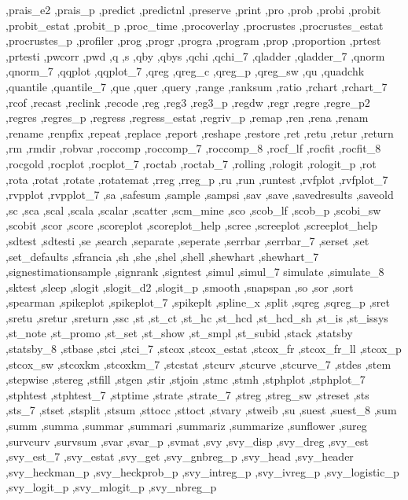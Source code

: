 {{    ,prais_e2 ,prais_p ,predict ,predictnl ,preserve ,print ,pro ,prob
    ,probi ,probit ,probit_estat ,probit_p ,proc_time ,procoverlay
    ,procrustes ,procrustes_estat ,procrustes_p ,profiler ,prog ,progr
    ,progra ,program ,prop ,proportion ,prtest ,prtesti ,pwcorr ,pwd
    ,q ,s ,qby ,qbys ,qchi ,qchi_7 ,qladder ,qladder_7 ,qnorm ,qnorm_7
    ,qqplot ,qqplot_7 ,qreg ,qreg_c ,qreg_p ,qreg_sw ,qu ,quadchk
    ,quantile ,quantile_7 ,que ,quer ,query ,range ,ranksum ,ratio
    ,rchart ,rchart_7 ,rcof ,recast ,reclink ,recode ,reg ,reg3
    ,reg3_p ,regdw ,regr ,regre ,regre_p2 ,regres ,regres_p ,regress
    ,regress_estat ,regriv_p ,remap ,ren ,rena ,renam ,rename ,renpfix
    ,repeat ,replace ,report ,reshape ,restore ,ret ,retu ,retur ,return
    ,rm ,rmdir ,robvar ,roccomp ,roccomp_7 ,roccomp_8 ,rocf_lf ,rocfit
    ,rocfit_8 ,rocgold ,rocplot ,rocplot_7 ,roctab ,roctab_7 ,rolling
    ,rologit ,rologit_p ,rot ,rota ,rotat ,rotate ,rotatemat ,rreg
    ,rreg_p ,ru ,run ,runtest ,rvfplot ,rvfplot_7 ,rvpplot ,rvpplot_7
    ,sa ,safesum ,sample ,sampsi ,sav ,save ,savedresults ,saveold ,sc
    ,sca ,scal ,scala ,scalar ,scatter ,scm_mine ,sco ,scob_lf ,scob_p
    ,scobi_sw ,scobit ,scor ,score ,scoreplot ,scoreplot_help ,scree
    ,screeplot ,screeplot_help ,sdtest ,sdtesti ,se ,search ,separate
    ,seperate ,serrbar ,serrbar_7 ,serset ,set ,set_defaults ,sfrancia
    ,sh ,she ,shel ,shell ,shewhart ,shewhart_7 ,signestimationsample
    ,signrank ,signtest ,simul ,simul_7 simulate ,simulate_8 ,sktest
    ,sleep ,slogit ,slogit_d2 ,slogit_p ,smooth ,snapspan ,so ,sor
    ,sort ,spearman ,spikeplot ,spikeplot_7 ,spikeplt ,spline_x ,split
    ,sqreg ,sqreg_p ,sret ,sretu ,sretur ,sreturn ,ssc ,st ,st_ct ,st_hc
    ,st_hcd ,st_hcd_sh ,st_is ,st_issys ,st_note ,st_promo ,st_set
    ,st_show ,st_smpl ,st_subid ,stack ,statsby ,statsby_8 ,stbase
    ,stci ,stci_7 ,stcox ,stcox_estat ,stcox_fr ,stcox_fr_ll ,stcox_p
    ,stcox_sw ,stcoxkm ,stcoxkm_7 ,stcstat ,stcurv ,stcurve ,stcurve_7
    ,stdes ,stem ,stepwise ,stereg ,stfill ,stgen ,stir ,stjoin ,stmc
    ,stmh ,stphplot ,stphplot_7 ,stphtest ,stphtest_7 ,stptime ,strate
    ,strate_7 ,streg ,streg_sw ,streset ,sts ,sts_7 ,stset ,stsplit
    ,stsum ,sttocc ,sttoct ,stvary ,stweib ,su ,suest ,suest_8 ,sum
    ,summ ,summa ,summar ,summari ,summariz ,summarize ,sunflower
    ,sureg ,survcurv ,survsum ,svar ,svar_p ,svmat ,svy ,svy_disp
    ,svy_dreg ,svy_est ,svy_est_7 ,svy_estat ,svy_get ,svy_gnbreg_p
    ,svy_head ,svy_header ,svy_heckman_p ,svy_heckprob_p ,svy_intreg_p
    ,svy_ivreg_p ,svy_logistic_p ,svy_logit_p ,svy_mlogit_p ,svy_nbreg_p
}}
